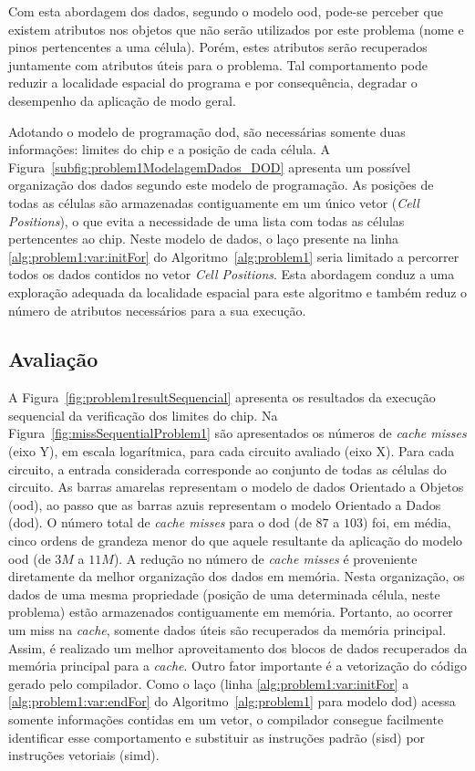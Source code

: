 Com esta abordagem dos dados, segundo o modelo \ac{ood}, pode-se perceber que existem atributos nos objetos que não serão utilizados por este problema (nome e pinos pertencentes a uma célula).
Porém, estes atributos serão recuperados juntamente com atributos úteis para o problema.
Tal comportamento pode reduzir a localidade espacial do programa e por consequência, degradar o desempenho da aplicação de modo geral.

Adotando o modelo de programação \ac{dod}, são necessárias somente duas informações: limites do chip e a posição de cada célula.
A Figura~\ref{subfig:problem1ModelagemDados_DOD} apresenta um possível organização dos dados segundo este modelo de programação.
As posições de todas as células são armazenadas contiguamente em um único vetor (\textit{Cell  Positions}), o que evita a necessidade de uma lista com todas as células pertencentes ao chip.
Neste modelo de dados, o laço presente na linha \ref{alg:problem1:var:initFor} do Algoritmo~\ref{alg:problem1} seria limitado a percorrer todos os dados contidos no vetor \textit{Cell  Positions}.
Esta abordagem conduz a uma exploração adequada da localidade espacial para este algoritmo e também reduz o número de atributos necessários para a sua execução.

\subsection{Avaliação}

A Figura~\ref{fig:problem1resultSequencial} apresenta os resultados da execução sequencial da verificação dos limites do chip.
Na Figura~\ref{fig:missSequentialProblem1} são apresentados os números de \textit{cache misses} (eixo Y), em escala logarítmica, para cada circuito avaliado (eixo X).
Para cada circuito, a entrada considerada corresponde ao conjunto de todas as células do circuito.
As barras amarelas representam o modelo de dados Orientado a Objetos (\ac{ood}), ao passo que as barras azuis representam o modelo Orientado a Dados (\ac{dod}). O número total de  \textit{cache misses} para o \ac{dod} (de $87$ a $103$) foi, em média, cinco ordens de grandeza menor do que aquele resultante da aplicação do modelo \ac{ood} (de $3M$ a $11M$). A redução no número de  \textit{cache misses} é proveniente diretamente da melhor organização dos dados em memória. Nesta organização, os dados de uma mesma propriedade (posição de uma determinada célula, neste problema) estão armazenados contiguamente em memória. Portanto, ao ocorrer um miss na \textit{cache}, somente dados úteis são recuperados da memória principal. Assim, é realizado um melhor aproveitamento dos blocos de dados recuperados da memória principal para a \textit{cache}.
Outro fator importante é a vetorização do código gerado pelo compilador. Como o laço (linha \ref{alg:problem1:var:initFor} a \ref{alg:problem1:var:endFor} do Algoritmo~\ref{alg:problem1} para modelo \ac{dod}) acessa somente informações contidas em um vetor, o compilador consegue facilmente identificar esse comportamento e substituir as instruções padrão (\ac{sisd}) por instruções vetoriais (\ac{simd}).

